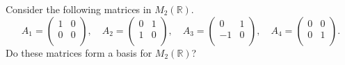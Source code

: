 \begin{example}
    Consider the following matrices in $M_2(\mathbb{R})$.
    \[
        A_1 = 
        \begin{pmatrix}
            1 & 0 \\
            0 & 0 \\
        \end{pmatrix}
        , \quad A_2 = 
        \begin{pmatrix}
            0 & 1 \\
            1 & 0 \\
        \end{pmatrix}
        , \quad A_3 = 
        \begin{pmatrix}
            0 & 1 \\
            -1 & 0 \\
        \end{pmatrix}
        , \quad A_4 = 
        \begin{pmatrix}
            0 & 0 \\
            0 & 1 \\
        \end{pmatrix}
        .
    \]
    Do these matrices form a basis for $M_2(\mathbb{R})$?
    

\end{example}
